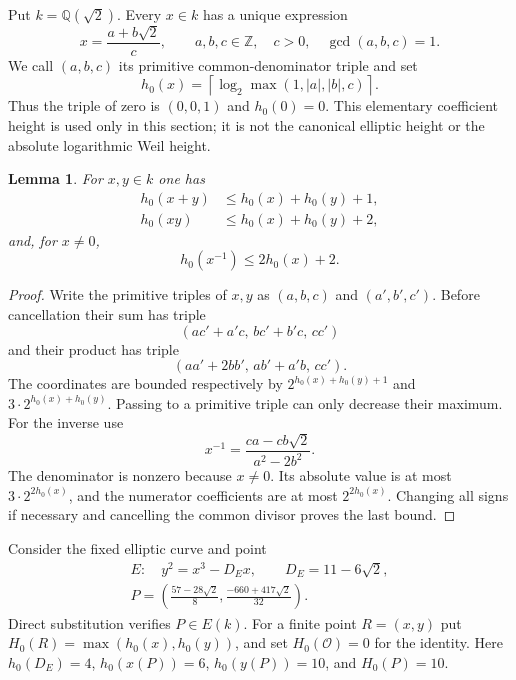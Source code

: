 \documentclass[11pt]{article}
\newtheorem{lemma}[theorem]{Lemma}
\theoremstyle{definition}
\begin{document}
Put $k=\mathbb Q(\sqrt2)$.  Every $x\in k$ has a unique expression
\[
 x=\frac{a+b\sqrt2}{c},\qquad
 a,b,c\in\mathbb Z,\quad c>0,\quad \gcd(a,b,c)=1.
\]
We call $(a,b,c)$ its primitive common-denominator triple and set
\[
 h_0(x)=\left\lceil\log_2\max(1,|a|,|b|,c)\right\rceil.
\]
Thus the triple of zero is $(0,0,1)$ and $h_0(0)=0$.  This elementary
coefficient height is used only in this section; it is not the canonical
elliptic height or the absolute logarithmic Weil height.

\begin{lemma}\label{lem:fixed-triple-height}
For $x,y\in k$ one has
\[
 \begin{aligned}
 h_0(x+y)&\le h_0(x)+h_0(y)+1,\\
 h_0(xy)&\le h_0(x)+h_0(y)+2,
 \end{aligned}
\]
and, for $x\ne0$,
\[
                         h_0(x^{-1})\le2h_0(x)+2.
\]
\end{lemma}
\begin{proof}
Write the primitive triples of $x,y$ as $(a,b,c)$ and
$(a',b',c')$.  Before cancellation their sum has triple
\[
 (ac'+a'c,\,bc'+b'c,\,cc')
\]
and their product has triple
\[
 (aa'+2bb',\,ab'+a'b,\,cc').
\]
The coordinates are bounded respectively by
$2^{h_0(x)+h_0(y)+1}$ and $3\cdot2^{h_0(x)+h_0(y)}$.
Passing to a primitive triple can only decrease their maximum.  For
the inverse use
\[
                  x^{-1}=\frac{ca-cb\sqrt2}{a^2-2b^2}.
\]
The denominator is nonzero because $x\ne0$.  Its absolute value is
at most $3\cdot2^{2h_0(x)}$, and the numerator coefficients are at
most $2^{2h_0(x)}$.  Changing all signs if necessary and cancelling
the common divisor proves the last bound.
\end{proof}

Consider the fixed elliptic curve and point
\[
 \begin{gathered}
 E:\quad y^2=x^3-D_E x,\qquad D_E=11-6\sqrt2,\\
 P=\left(\frac{57-28\sqrt2}{8},
          \frac{-660+417\sqrt2}{32}\right).
 \end{gathered}
\]
Direct substitution verifies $P\in E(k)$.  For a finite point
$R=(x,y)$ put $H_0(R)=\max(h_0(x),h_0(y))$, and set
$H_0(\mathcal O)=0$ for the identity.  Here $h_0(D_E)=4$,
$h_0(x(P))=6$, $h_0(y(P))=10$, and $H_0(P)=10$.
\end{document}
